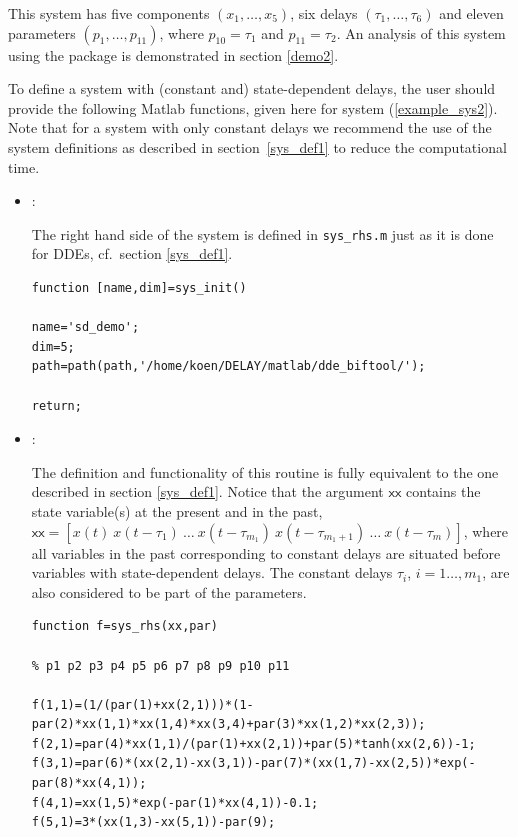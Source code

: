 \documentclass[10pt]{article}
\gdef \file#1{{\bfseries{\ttfamily{#1}}}}
\gdef \parm#1{{\mathsf{#1}}}
\newenvironment{boxit}[1]{\begin{center}\begin{lrbox}{\savepar}
  \begin{minipage}[b]{#1}}{\end{minipage}\end{lrbox}\fbox{\usebox{\savepar}}
  \end{center}}
\begin{document}
{This system has five components $(x_1,\ldots,x_5)$, six delays
$(\tau_1,\ldots,\tau_6)$ and eleven parameters $(p_1,\ldots,p_{11})$,
where $p_{10}=\tau_1$ and $p_{11}=\tau_2$. 
An analysis of this system using the package
is demonstrated in section \ref{demo2}.

To define a system with (constant and) state-dependent delays, the user 
should provide the following Matlab
functions, given here for system (\ref{example_sys2}).
Note that for a system with only constant delays 
we recommend the use of the system definitions 
as described in section~\ref{sys_def1} to reduce the computational time.

\begin{itemize}

\item \file{sys\_init.m}:

The right hand side of the system is defined in \verb=sys_rhs.m= just as it is done for DDEs, cf.\ section \ref{sys_def1}.

\begin{boxit}{9.5cm}
{\small\begin{verbatim}
function [name,dim]=sys_init()

name='sd_demo';
dim=5;
path=path(path,'/home/koen/DELAY/matlab/dde_biftool/');

return;
\end{verbatim}}
\end{boxit}

\item \file{sys\_rhs.m}:

The definition and functionality of this routine is fully 
equivalent to the one described in section \ref{sys_def1}.
Notice that the argument $\parm{xx}$ contains the state variable(s) at the
present and in the past, 
$\parm{xx}=[x(t)\ x(t-\tau_1)\ \ldots\ x(t-\tau_{m_1})\ x(t-\tau_{m_1+1})\ \ldots\ x(t-\tau_m)]$,
where all variables in the past corresponding to constant
delays are situated before variables with state-dependent delays.
The constant delays $\tau_i$, $i=1\ldots,m_1$, are also considered 
to be part of the parameters.

\begin{boxit}{14.5cm}
{\small\begin{verbatim}
function f=sys_rhs(xx,par)

% p1 p2 p3 p4 p5 p6 p7 p8 p9 p10 p11

f(1,1)=(1/(par(1)+xx(2,1)))*(1-par(2)*xx(1,1)*xx(1,4)*xx(3,4)+par(3)*xx(1,2)*xx(2,3));
f(2,1)=par(4)*xx(1,1)/(par(1)+xx(2,1))+par(5)*tanh(xx(2,6))-1;
f(3,1)=par(6)*(xx(2,1)-xx(3,1))-par(7)*(xx(1,7)-xx(2,5))*exp(-par(8)*xx(4,1));
f(4,1)=xx(1,5)*exp(-par(1)*xx(4,1))-0.1;
f(5,1)=3*(xx(1,3)-xx(5,1))-par(9); 


\end{verbatim}}
\end{boxit}
\end{itemize}}
\end{document}
